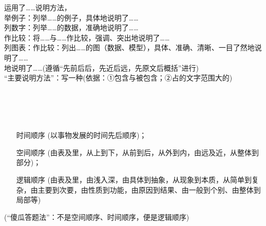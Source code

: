 运用了\ldots{}\ldots{}说明方法，\\
举例子：列举\ldots{}\ldots{}的例子，具体地说明了\ldots{}\ldots{}\\
列数字：列举\ldots{}\ldots{}的数据，准确地说明了\ldots{}\ldots{}\\
作比较：将\ldots{}\ldots{}与\ldots{}\ldots{}作比较，强调、突出地说明了\ldots{}\ldots{}\\
列图表：作比较：列出\ldots{}\ldots{}的图（数据、模型），具体、准确、清晰、一目了然地说明了\ldots{}\ldots{}\\
地说明了\ldots{}\ldots{}(遵循``先前后后，先近后远，先原文后概括''进行)\\
``主要说明方法''：写一种(依据：①包含与被包含；②占的文字范围大的)\\
\\
\\
\\
\\

\begin{itemize}
\item[时间顺序](以事物发展的时间先后顺序)；
\item[空间顺序](由表及里，从上到下，从前到后，从外到内，由远及近，从整体到部分)；
\item[逻辑顺序](由表及里，由浅入深，由具体到抽象，从现象到本质，从简单到复杂，由主要到次要，由性质到功能，由原因到结果、由一般到个别、由整体到局部等)
\end{itemize}
(``傻瓜答题法''：不是空间顺序、时间顺序，便是逻辑顺序)

